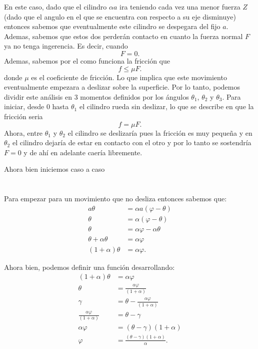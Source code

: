 \documentclass{report}
\begin{document}
En este caso, dado que el cilindro $\alpha a$ ira teniendo cada vez una menor fuerza $Z$ (dado que el angulo en el que se encuentra con respecto a su eje disminuye) entonces sabemos que eventualmente este cilindro se despegara del fijo $a$. Ademas, sabemos que estos dos perderán contacto en cuanto la fuerza normal  $F$ ya no tenga ingerencia. Es decir, cuando \[
F = 0
.\] Ademas, sabemos por el como funciona la fricción que \[
f \le \mu F
.\] donde $\mu$ es el coeficiente de fricción. Lo que implica que este movimiento eventualmente empezara a deslizar sobre la superficie. Por lo tanto, podemos dividir este análisis en 3 momentos definidos por los ángulos $\theta_1$, $\theta_2$ y $\theta_3$. Para iniciar, desde $0$ hasta $\theta_1$ el cilindro rueda sin deslizar, lo que se describe en que la fricción seria \[
f = \mu F
.\] Ahora, entre $\theta_1$ y $\theta_2$ el cilindro se deslizaría pues la fricción es muy pequeña y en $\theta_2$ el cilindro dejaría de estar en contacto con el otro y por lo tanto se sostendría $F = 0$ y de ahí en adelante caería libremente.

Ahora bien iniciemos caso a caso
\section{}

Para empezar para un movimiento que no desliza entonces sabemos que:
\begin{align*}
  a\theta &= \alpha a \left( \varphi - \theta \right) \\
  \theta &= \alpha \left( \varphi - \theta \right) \\
  \theta &= \alpha \varphi - \alpha \theta \\
  \theta + \alpha \theta &= \alpha\varphi \\
  \left( 1 + \alpha \right) \theta &= \alpha \varphi
.\end{align*}

Ahora bien, podemos definir una función desarrollando:
\begin{align*}
  \left( 1 + \alpha \right) \theta &= \alpha \varphi \\
  \theta &= \frac{\alpha \varphi}{\left( 1 + \alpha \right) } \\
  \gamma &= \theta - \frac{\alpha \varphi}{\left( 1 + \alpha \right) }\\
  \frac{\alpha \varphi}{\left( 1 + \alpha \right) } &= \theta - \gamma \\
  \alpha \varphi &= \left( \theta - \gamma \right) \left( 1 + \alpha \right)  \\
  \varphi &= \frac{\left( \theta - \gamma \right) \left( 1 + \alpha \right) }{\alpha}
.\end{align*}
\end{document}
